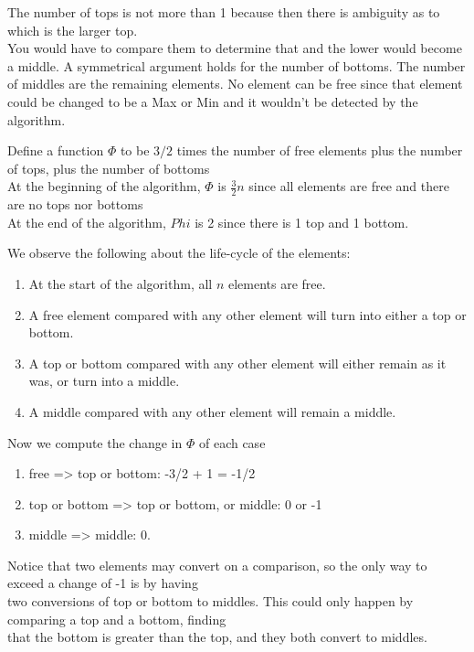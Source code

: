 \documentclass[11pt]{article}
\begin{document}
The number of tops is not more than 1 because then there is ambiguity as to which is the larger top.\\
You would have to compare them to determine that and the lower would become a middle. A symmetrical argument
holds for the number of bottoms. The number of middles are the remaining elements. No element can be free
since that element could be changed to be a Max or Min and it wouldn't be detected by the algorithm.

Define a function $\Phi$ to be $3/2$ times the number of free elements plus the number of tops, plus the number of bottoms\\
At the beginning of the algorithm, $\Phi$ is $\frac{3}{2} n$ since all elements are free and there are no tops nor bottoms\\
At the end of the algorithm, $Phi$ is 2 since there is 1 top and 1 bottom.

We observe the following about the life-cycle of the elements:

\begin{enumerate}
\item At the start of the algorithm, all $n$ elements are free.
\item A free element compared with any other element will turn into either a top or bottom.
\item A top or bottom compared with any other element will either remain as it was, or turn into a middle.
\item A middle compared with any other element will remain a middle.
\end{enumerate}

Now we compute the change in $\Phi$ of each case

\begin{enumerate}
\item free => top or bottom: -3/2 + 1 = -1/2
\item top or bottom => top or bottom, or middle: 0 or -1
\item middle => middle: 0.
\end{enumerate}

Notice that two elements may convert on a comparison, so the only way to exceed a change of -1 is by having\\
two conversions of top or bottom to middles. This could only happen by comparing a top and a bottom, finding\\
that the bottom is greater than the top, and they both convert to middles.
\end{document}
